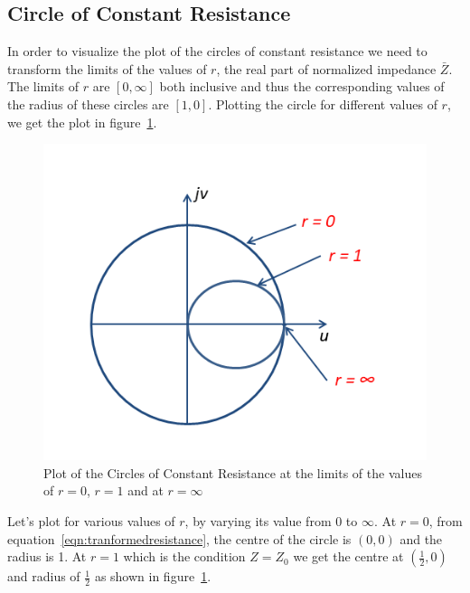 \subsection{Circle of Constant Resistance}
In order to visualize the plot of the circles of constant resistance we need to transform the limits of the values of $r$, the real part of normalized impedance $\bar{Z}$. The limits of $r$ are $[0, \infty]$ both inclusive and thus the corresponding values of the radius of these circles are $[1, 0]$. Plotting the circle for different values of $r$, we get the plot in figure~\ref{fig:ouytre}.
\begin{figure}[h]
\centering
\includegraphics[width=1\linewidth]{graphics/fig2.35}
\caption{Plot of the Circles of Constant Resistance at the limits of the values of $r = 0$, $r = 1$ and at $r = \infty$}
\label{fig:ouytre}
\end{figure}

Let's plot for various values of $r$, by varying its value from 0 to $\infty$. At $r = 0$, from equation~\eqref{eqn:tranformedresistance}, the centre of the circle is $(0,0)$ and the radius is 1. At $r = 1$ which is the condition $Z = Z_0$ we get the centre at $\left(\frac{1}{2}, 0\right)$ and radius of $\frac{1}{2}$ as shown in figure~\ref{fig:ouytre}.

